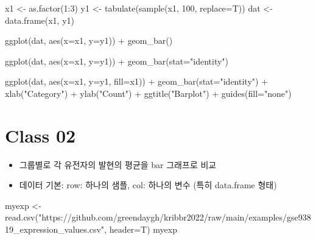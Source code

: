 \documentclass[
]{book}
\newenvironment{Shaded}{\begin{snugshade}}{\end{snugshade}}
\newcommand{\AttributeTok}[1]{\textcolor[rgb]{0.77,0.63,0.00}{#1}}
\newcommand{\DecValTok}[1]{\textcolor[rgb]{0.00,0.00,0.81}{#1}}
\newcommand{\FunctionTok}[1]{\textcolor[rgb]{0.00,0.00,0.00}{#1}}
\newcommand{\NormalTok}[1]{#1}
\newcommand{\OtherTok}[1]{\textcolor[rgb]{0.56,0.35,0.01}{#1}}
\newcommand{\SpecialCharTok}[1]{\textcolor[rgb]{0.00,0.00,0.00}{#1}}
\newcommand{\StringTok}[1]{\textcolor[rgb]{0.31,0.60,0.02}{#1}}
\providecommand{\tightlist}{%
  \setlength{\itemsep}{0pt}\setlength{\parskip}{0pt}}
\begin{document}
\begin{Shaded}
\begin{Highlighting}[]
\NormalTok{x1 }\OtherTok{\textless{}{-}} \FunctionTok{as.factor}\NormalTok{(}\DecValTok{1}\SpecialCharTok{:}\DecValTok{3}\NormalTok{)}
\NormalTok{y1 }\OtherTok{\textless{}{-}} \FunctionTok{tabulate}\NormalTok{(}\FunctionTok{sample}\NormalTok{(x1, }\DecValTok{100}\NormalTok{, }\AttributeTok{replace=}\NormalTok{T))}
\NormalTok{dat }\OtherTok{\textless{}{-}} \FunctionTok{data.frame}\NormalTok{(x1, y1)}

\FunctionTok{ggplot}\NormalTok{(dat, }\FunctionTok{aes}\NormalTok{(}\AttributeTok{x=}\NormalTok{x1, }\AttributeTok{y=}\NormalTok{y1)) }\SpecialCharTok{+}
  \FunctionTok{geom\_bar}\NormalTok{()}

\FunctionTok{ggplot}\NormalTok{(dat, }\FunctionTok{aes}\NormalTok{(}\AttributeTok{x=}\NormalTok{x1, }\AttributeTok{y=}\NormalTok{y1)) }\SpecialCharTok{+}
  \FunctionTok{geom\_bar}\NormalTok{(}\AttributeTok{stat=}\StringTok{"identity"}\NormalTok{)}

\FunctionTok{ggplot}\NormalTok{(dat, }\FunctionTok{aes}\NormalTok{(}\AttributeTok{x=}\NormalTok{x1, }\AttributeTok{y=}\NormalTok{y1, }\AttributeTok{fill=}\NormalTok{x1)) }\SpecialCharTok{+}
  \FunctionTok{geom\_bar}\NormalTok{(}\AttributeTok{stat=}\StringTok{"identity"}\NormalTok{) }\SpecialCharTok{+}
  \FunctionTok{xlab}\NormalTok{(}\StringTok{"Category"}\NormalTok{) }\SpecialCharTok{+}
  \FunctionTok{ylab}\NormalTok{(}\StringTok{"Count"}\NormalTok{) }\SpecialCharTok{+}
  \FunctionTok{ggtitle}\NormalTok{(}\StringTok{"Barplot"}\NormalTok{) }\SpecialCharTok{+}
  \FunctionTok{guides}\NormalTok{(}\AttributeTok{fill=}\StringTok{"none"}\NormalTok{)}
\end{Highlighting}
\end{Shaded}

\hypertarget{class-02}{%
\section{Class 02}\label{class-02}}

\begin{itemize}
\tightlist
\item
  그룹별로 각 유전자의 발현의 평균을 bar 그래프로 비교
\item
  데이터 기본: row: 하나의 샘플, col: 하나의 변수 (특히 data.frame 형태)
\end{itemize}

\begin{Shaded}
\begin{Highlighting}[]
\NormalTok{myexp }\OtherTok{\textless{}{-}} \FunctionTok{read.csv}\NormalTok{(}\StringTok{"https://github.com/greendaygh/kribbr2022/raw/main/examples/gse93819\_expression\_values.csv"}\NormalTok{, }\AttributeTok{header=}\NormalTok{T)}
\NormalTok{myexp}
\end{Highlighting}
\end{Shaded}
\end{document}
